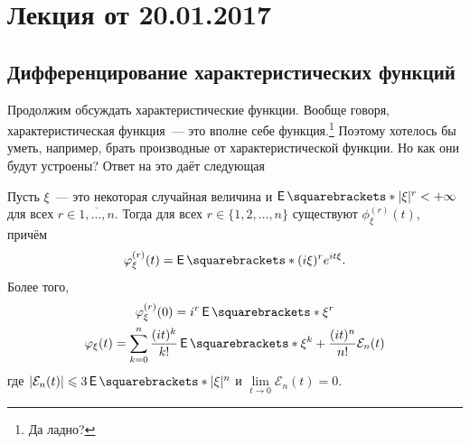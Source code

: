 \section{Лекция от 20.01.2017}
\subsection{Дифференцирование характеристических функций}
Продолжим обсуждать характеристические функции. Вообще говоря, характеристическая функция~--- это вполне себе функция.\footnote{Да ладно?} Поэтому хотелось бы уметь, например, брать производные от характеристической функции. Но как они будут устроены? Ответ на это даёт следующая
\begin{theorem}
	Пусть \(\xi\)~--- это некоторая случайная величина и \(\E{|\xi|^r} < +\infty\) для всех \(r \in \overline{1,\ldots,n}\). Тогда для всех \(r \in \{1, 2, \dots, n\}\) существуют \(\phi_{\xi}^{(r)}(t)\), причём
	\[
		\phi_{\xi}^{(r)}(t) = \E{(i\xi)^re^{it\xi}}.
	\]
	Более того,
	\begin{gather*}
		\phi_{\xi}^{(r)}(0) = i^r\E{\xi^r} \\
		\phi_{\xi}(t) = \sum_{k = 0}^{n} \frac{(it)^k}{k!}\E{\xi^k} + \frac{(it)^n}{n!}\mathcal{E}_n(t)
	\end{gather*}
	где \(\left|\mathcal{E}_n(t)\right| \leq 3\E{|\xi|^n}\) и \(\lim\limits_{t \to 0} \mathcal{E}_n(t) = 0\).
\end{theorem}
